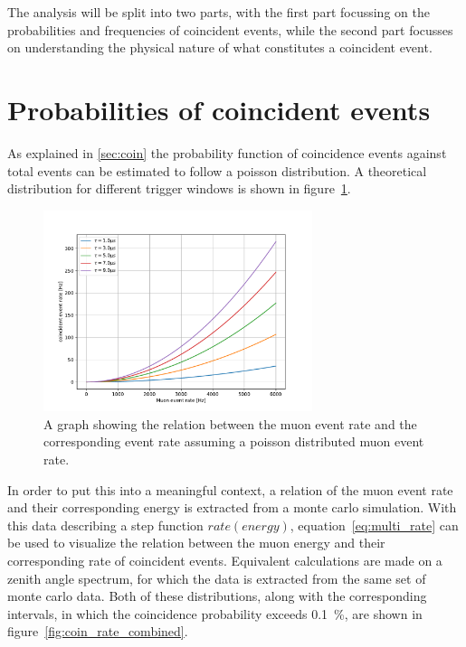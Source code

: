 The analysis will be split into two parts, with the first part focussing on the probabilities and frequencies of coincident events, while the second part 
focusses on understanding the physical nature of what constitutes a coincident event. 

\section{Probabilities of coincident events}%

As explained in \ref{sec:coin} the probability function of coincidence events against total events can be estimated to follow a poisson distribution.
A theoretical distribution for different trigger windows is shown in figure~\ref{fig:coin_rate_rate}. 

\begin{figure}
    \centering
    \includegraphics[width=0.7\textwidth]{Plots/coincidence_rate_poisson.pdf}
    \caption{A graph showing the relation between the muon event rate and the corresponding event rate assuming a poisson distributed muon event rate.}
    \label{fig:coin_rate_rate}
\end{figure}

In order to put this into a meaningful context, a relation of the muon event rate and their corresponding energy is extracted from a monte carlo simulation.
With this data describing a step function $rate(energy)$, equation~\ref{eq:multi_rate} can be used to visualize the relation between the muon energy and their 
corresponding rate of coincident events. Equivalent calculations are made on a zenith angle spectrum, for which the data is extracted from the same set of monte 
carlo data. Both of these distributions, along with the corresponding intervals, in which the coincidence probability exceeds \SI{0.1}{\percent}, are shown in 
figure~\ref{fig:coin_rate_combined}.

